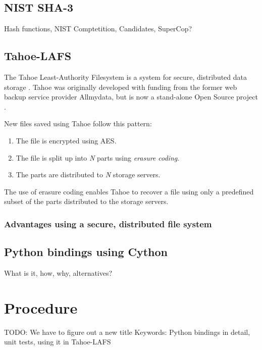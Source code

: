 \documentclass[english,12pt,a4paper]{book}
\begin{document}
\section{NIST SHA-3}

Hash functions, NIST Comptetition, Candidates, SuperCop?

\section{Tahoe-LAFS}

The Tahoe Least-Authority Filesystem is a system for secure,
distributed data storage \cite{t_tahoe}. Tahoe was originally developed with
funding from the former web backup service provider Allmydata, but is now a
stand-alone Open Source project \cite{t_ars}.

New files saved using Tahoe follow this pattern:
\begin{enumerate}
\item The file is encrypted using AES.
\item The file is split up into \emph{N} parts using \emph{erasure coding}.
\item The parts are distributed to \emph{N} storage servers.
\end{enumerate}

The use of erasure coding enables Tahoe to recover a file using only a
predefined subset of the parts distributed to the storage servers.


\subsection{Advantages using a secure, distributed file system}


\section{Python bindings using Cython}

What is it, how, why, alternatives?


\chapter{Procedure}

TODO: We have to figure out a new title
Keywords: Python bindings in detail, unit tests, using it in Tahoe-LAFS
\end{document}
